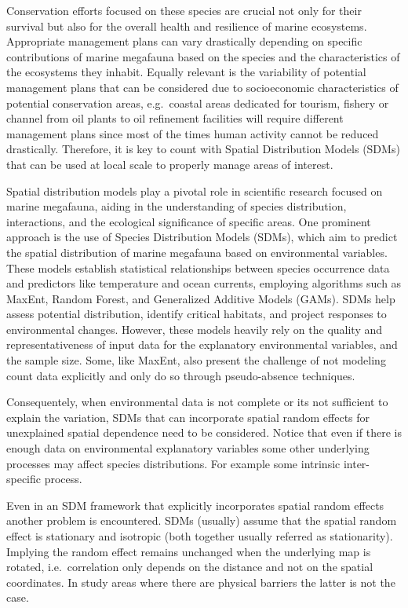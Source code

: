 \documentclass[
]{book}
\begin{document}
Conservation efforts focused on these species are crucial not only for their survival but also for the overall health and resilience of marine ecosystems. Appropriate management plans can vary drastically depending on specific contributions of marine megafauna based on the species and the characteristics of the ecosystems they inhabit. Equally relevant is the variability of potential management plans that can be considered due to socioeconomic characteristics of potential conservation areas, e.g.~coastal areas dedicated for tourism, fishery or channel from oil plants to oil refinement facilities will require different management plans since most of the times human activity cannot be reduced drastically. Therefore, it is key to count with Spatial Distribution Models (SDMs) that can be used at local scale to properly manage areas of interest.

Spatial distribution models play a pivotal role in scientific research focused on marine megafauna, aiding in the understanding of species distribution, interactions, and the ecological significance of specific areas. One prominent approach is the use of Species Distribution Models (SDMs), which aim to predict the spatial distribution of marine megafauna based on environmental variables. These models establish statistical relationships between species occurrence data and predictors like temperature and ocean currents, employing algorithms such as MaxEnt, Random Forest, and Generalized Additive Models (GAMs). SDMs help assess potential distribution, identify critical habitats, and project responses to environmental changes. However, these models heavily rely on the quality and representativeness of input data for the explanatory environmental variables, and the sample size. Some, like MaxEnt, also present the challenge of not modeling count data explicitly and only do so through pseudo-absence techniques.

Consequentely, when environmental data is not complete or its not sufficient to explain the variation, SDMs that can incorporate spatial random effects for unexplained spatial dependence need to be considered. Notice that even if there is enough data on environmental explanatory variables some other underlying processes may affect species distributions. For example some intrinsic inter-specific process.

Even in an SDM framework that explicitly incorporates spatial random effects another problem is encountered. SDMs (usually) assume that the spatial random effect is stationary and isotropic (both together usually referred as stationarity). Implying the random effect remains unchanged when the underlying map is rotated, i.e.~correlation only depends on the distance and not on the spatial coordinates. In study areas where there are physical barriers the latter is not the case.
\end{document}
